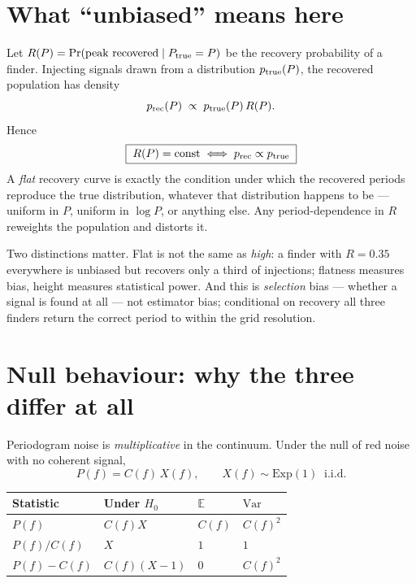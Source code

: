 \documentclass[11pt]{article}
\begin{document}
\section{What ``unbiased'' means here}

Let $R(P) = \Pr(\text{peak recovered} \mid P_{\rm true}=P)$ be the recovery probability of
a finder. Injecting signals drawn from a distribution $p_{\rm true}(P)$, the recovered
population has density
%
\begin{equation}
  p_{\rm rec}(P) \;\propto\; p_{\rm true}(P)\, R(P) .
  \label{eq:selection}
\end{equation}
%
Hence
%
\begin{equation}
  \boxed{\;R(P) = \text{const} \iff p_{\rm rec} \propto p_{\rm true}\;}
  \label{eq:unbiased}
\end{equation}
%
A \emph{flat} recovery curve is exactly the condition under which the recovered periods
reproduce the true distribution, whatever that distribution happens to be --- uniform in
$P$, uniform in $\log P$, or anything else. Any period-dependence in $R$ reweights the
population and distorts it.

Two distinctions matter. Flat is not the same as \emph{high}: a finder with
$R = 0.35$ everywhere is unbiased but recovers only a third of injections; flatness
measures bias, height measures statistical power. And this is \emph{selection} bias ---
whether a signal is found at all --- not estimator bias; conditional on recovery all three
finders return the correct period to within the grid resolution.

\section{Null behaviour: why the three differ at all}

Periodogram noise is \emph{multiplicative} in the continuum. Under the null of red noise
with no coherent signal,
%
\begin{equation}
  P(f) = C(f)\,X(f), \qquad X(f)\sim\mathrm{Exp}(1) \;\;\text{i.i.d.}
  \label{eq:null}
\end{equation}

\begin{table}[htbp]
\centering
\begin{tabular}{llll}
\toprule
Statistic & Under $H_0$ & $\mathbb{E}$ & $\mathrm{Var}$ \\
\midrule
$P(f)$      & $C(f)X$     & $C(f)$ & $C(f)^2$ \\
$P(f)/C(f)$ & $X$         & $1$    & $1$ \\
$P(f)-C(f)$ & $C(f)(X-1)$ & $0$    & $C(f)^2$ \\
\bottomrule
\end{tabular}
\end{table}
\end{document}
